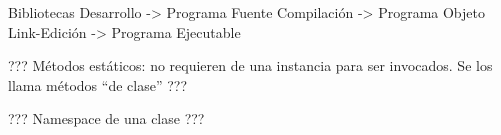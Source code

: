 Bibliotecas
Desarrollo -> Programa Fuente
Compilación -> Programa Objeto
Link-Edición -> Programa Ejecutable


??? Métodos estáticos: no requieren de una instancia para ser invocados. Se los llama métodos “de clase” ???

??? Namespace de una clase ???
